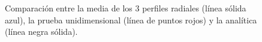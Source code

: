 \documentclass[12pt,a4paper]{book}
\begin{document}
\begin{figure}
  \centering
    \caption{Comparación entre la media de los 3 perfiles radiales (línea sólida azul), 
    la prueba unidimensional (línea de puntos rojos) y la analítica (línea negra sólida).}\label{fig:comparacion_perfil_mean}
\end{figure}
\end{document}

